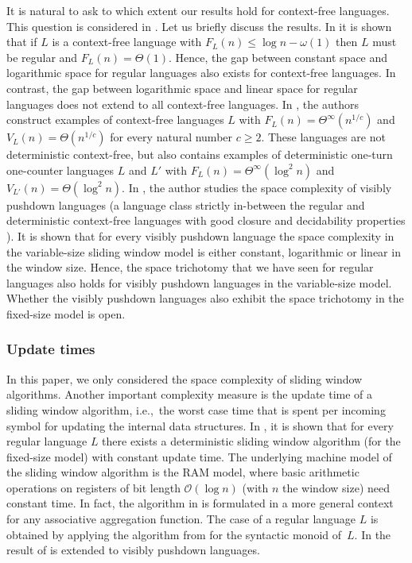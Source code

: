 \documentclass{theoretics}
\renewcommand{\O}{\mathcal{O}}
\renewcommand{\geq}{\geqslant}
\renewcommand{\leq}{\leqslant}
\newcommand{\Thetainf}{\Theta^{\scriptscriptstyle{\infty}}}
\begin{document}
It is natural to ask to which extent our results hold for context-free languages. This 
question is considered in \cite{GanardiJL18,Ganardi19}. Let us briefly discuss the results.
In \cite{GanardiJL18} it is shown that if $L$ is a context-free language with $F_L(n) \leq \log n - \omega(1)$
then $L$ must be regular and $F_L(n) = \Theta(1)$. Hence, the gap between constant space and logarithmic
space for regular languages also exists for context-free languages. In contrast, the gap between logarithmic
space and linear space for regular languages does not extend to all context-free languages. In  \cite{GanardiJL18},
the authors construct examples of context-free languages $L$ with $F_L(n) = \Thetainf(n^{1/c})$ and $V_L(n) = \Theta(n^{1/c})$ for every natural
number $c \geq 2$. These languages are not deterministic context-free, but \cite{GanardiJL18} also contains
examples of deterministic one-turn one-counter languages $L$ and $L'$ with $F_L(n) = \Thetainf(\log^2 n)$
and $V_{L'}(n) = \Theta(\log^2 n)$. In \cite{Ganardi19}, the author studies  the space complexity of visibly pushdown languages (a 
language class strictly in-between the regular and deterministic 
context-free languages with good closure and decidability properties \cite{AlurM04}). 
It is shown that for every visibly pushdown language the space complexity in the variable-size sliding window model is either constant, logarithmic or linear in the window size. 
Hence, the space trichotomy that we have seen for regular languages also holds for visibly pushdown languages in the variable-size model.
Whether the visibly pushdown languages also exhibit the space trichotomy in the fixed-size model is open.


\subsubsection{Update times}

In this paper, we only considered the space complexity of sliding window algorithms.
Another important complexity measure is the update time of a sliding window algorithm, i.e.,~the 
worst case time that is spent per incoming symbol for updating the internal data structures.
In \cite{TangwongsanH017}, it is shown that for every regular language $L$ there exists
a deterministic sliding window algorithm (for the fixed-size model) with constant update time.
The underlying machine model of the sliding window algorithm is the RAM model, where basic arithmetic operations on registers
of bit length $ \O(\log n)$ (with $n$ the window size) need constant time. In fact,
the algorithm in \cite{TangwongsanH017} is formulated in a more general context for any associative
aggregation function. The case of a regular language $L$ is obtained by applying the algorithm
from \cite{TangwongsanH017} for the syntactic monoid of~$L$. In \cite{GanardiJLS22} the result of \cite{TangwongsanH017}
is extended to visibly pushdown languages. 
\end{document}
